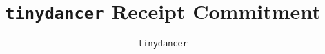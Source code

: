 \documentclass[letterpaper,11pt]{article}
\begin{document}
\title{\texttt{tinydancer} Receipt Commitment}
\author{\texttt{tinydancer}}
\date{}

\maketitle

\vspace{-15mm}





\newpage
% 
% 
\end{document}
